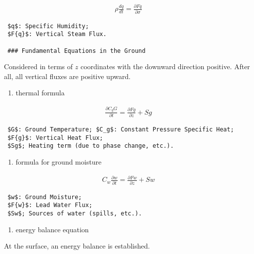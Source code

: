 \begin{eqnarray}
  \rho \frac{dq}{dt} = \frac{\partial Fq}{\partial \sigma} 
\end{eqnarray}

\begin{verbatim}
 $q$: Specific Humidity;
 $F{q}$: Vertical Steam Flux.

 ### Fundamental Equations in the Ground
\end{verbatim}

Considered in terms of \(z\) coordinates with the downward direction
positive. After all, all vertical fluxes are positive upward.

\begin{enumerate}
\def\labelenumi{\arabic{enumi}.}
\setcounter{enumi}{3}
\tightlist
\item
  thermal formula
\end{enumerate}

\begin{eqnarray}
  \frac{\partial C_g G}{\partial t} = \frac{\partial Fg}{\partial z} + Sg
\end{eqnarray}

\begin{verbatim}
 $G$: Ground Temperature; $C_g$: Constant Pressure Specific Heat;
 $F{g}$: Vertical Heat Flux;
 $Sg$; Heating term (due to phase change, etc.).
\end{verbatim}

\begin{enumerate}
\def\labelenumi{\arabic{enumi}.}
\setcounter{enumi}{4}
\tightlist
\item
  formula for ground moisture
\end{enumerate}

\begin{eqnarray}
  C_w \frac{\partial w}{\partial t} = \frac{\partial Fw}{\partial z} + Sw
\end{eqnarray}

\begin{verbatim}
 $w$: Ground Moisture;
 $F{w}$: Lead Water Flux;
 $Sw$; Sources of water (spills, etc.).
\end{verbatim}

\begin{enumerate}
\def\labelenumi{\arabic{enumi}.}
\setcounter{enumi}{5}
\tightlist
\item
  energy balance equation
\end{enumerate}

At the surface, an energy balance is established.

